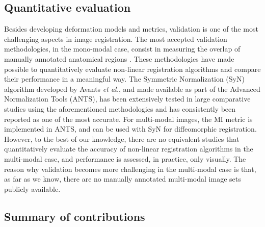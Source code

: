 \subsection{Quantitative evaluation}
Besides developing deformation models and metrics, validation is one of the most challenging aspects in image registration. The most accepted validation methodologies, in the mono-modal case, consist in measuring the overlap of manually annotated anatomical regions \citep{Klein2009, Klein2010, Rohlfing2012}. These methodologies have made possible to quantitatively evaluate non-linear registration algorithms and compare their performance in a meaningful way. The Symmetric Normalization (SyN) algorithm developed by Avants {\it et al.}, and made available as part of the Advanced Normalization Tools (ANTS), has been extensively tested in large comparative studies using the aforementioned methodologies and has consistently been reported as one of the most accurate. For multi-modal images, the MI metric is implemented in ANTS, and can be used with SyN for diffeomorphic registration. However, to the best of our knowledge, there are no equivalent studies that quantitatively evaluate the accuracy of non-linear registration algorithms in the multi-modal case, and performance is assessed, in practice, only visually. The reason why validation becomes more challenging in the multi-modal case is that, as far as we know, there are no manually annotated multi-modal image sets publicly available.

\subsection{Summary of contributions}







